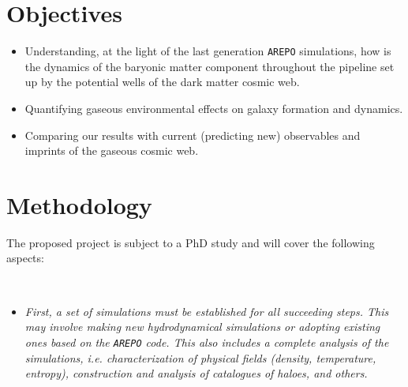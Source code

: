 \documentclass[a4,useAMS,usenatbib,usegraphicx,12pt]{article}
\begin{document}

\newpage
\section{Objectives}


\begin{itemize}

\item[\checkmark] Understanding, at the light of the last generation \texttt{AREPO} 
simulations, how is the dynamics of the baryonic matter component throughout
the pipeline set up by the potential wells of the dark matter cosmic web.

\item[\checkmark] Quantifying gaseous environmental effects on galaxy formation
and dynamics.

\item[\checkmark] Comparing our results with current (predicting new) observables 
and imprints of the gaseous cosmic web.


\end{itemize}



\section{Methodology}


The proposed project is subject to a PhD study and will cover the following 
aspects:

\

\begin{itemize}

\item[\checkmark] \textit{First, a set of simulations must be established for 
all succeeding steps. This may involve making new hydrodynamical simulations or
adopting existing ones based on the \texttt{AREPO} code. This also includes a 
complete analysis of the simulations, i.e. characterization of physical fields 
(density, temperature, entropy), construction and analysis of catalogues of 
haloes, and others.}

\end{itemize}
\end{document}
